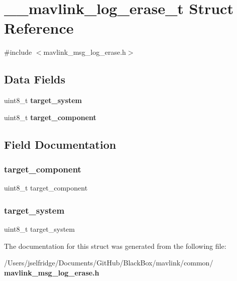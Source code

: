 \section{\+\_\+\+\_\+mavlink\+\_\+log\+\_\+erase\+\_\+t Struct Reference}
\label{struct____mavlink__log__erase__t}


{\ttfamily \#include $<$mavlink\+\_\+msg\+\_\+log\+\_\+erase.\+h$>$}

\subsection*{Data Fields}
\begin{DoxyCompactItemize}
\item 
uint8\+\_\+t \textbf{ target\+\_\+system}
\item 
uint8\+\_\+t \textbf{ target\+\_\+component}
\end{DoxyCompactItemize}


\subsection{Field Documentation}
\mbox{\label{struct____mavlink__log__erase__t_a1763123cfc5fa7f9c51ec44947d5790f}} 
\subsubsection{target\+\_\+component}
{\footnotesize\ttfamily uint8\+\_\+t target\+\_\+component}

\mbox{\label{struct____mavlink__log__erase__t_ac9afff43526a157e4c4e45607c1418b8}} 
\subsubsection{target\+\_\+system}
{\footnotesize\ttfamily uint8\+\_\+t target\+\_\+system}



The documentation for this struct was generated from the following file\+:\begin{DoxyCompactItemize}
\item 
/\+Users/jselfridge/\+Documents/\+Git\+Hub/\+Black\+Box/mavlink/common/\textbf{ mavlink\+\_\+msg\+\_\+log\+\_\+erase.\+h}\end{DoxyCompactItemize}
